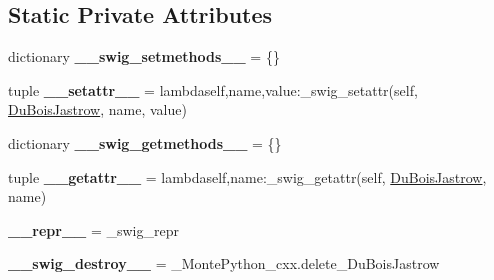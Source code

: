 \subsection*{Static Private Attributes}
\begin{DoxyCompactItemize}
\item 
\hypertarget{classMontePython__cxx_1_1DuBoisJastrow_a732f9b837b386085402f1f03011d7539}{}dictionary {\bfseries \+\_\+\+\_\+swig\+\_\+setmethods\+\_\+\+\_\+} = \{\}\label{classMontePython__cxx_1_1DuBoisJastrow_a732f9b837b386085402f1f03011d7539}

\item 
\hypertarget{classMontePython__cxx_1_1DuBoisJastrow_acb3d90c5bdc55fd408e559f2d5fac170}{}tuple {\bfseries \+\_\+\+\_\+setattr\+\_\+\+\_\+} = lambdaself,name,value\+:\+\_\+swig\+\_\+setattr(self, \hyperlink{classMontePython__cxx_1_1DuBoisJastrow}{Du\+Bois\+Jastrow}, name, value)\label{classMontePython__cxx_1_1DuBoisJastrow_acb3d90c5bdc55fd408e559f2d5fac170}

\item 
\hypertarget{classMontePython__cxx_1_1DuBoisJastrow_a7ad1853b1e6bea21055c01d6d36e38ff}{}dictionary {\bfseries \+\_\+\+\_\+swig\+\_\+getmethods\+\_\+\+\_\+} = \{\}\label{classMontePython__cxx_1_1DuBoisJastrow_a7ad1853b1e6bea21055c01d6d36e38ff}

\item 
\hypertarget{classMontePython__cxx_1_1DuBoisJastrow_af15ca982a357ec9f2b730cc644890070}{}tuple {\bfseries \+\_\+\+\_\+getattr\+\_\+\+\_\+} = lambdaself,name\+:\+\_\+swig\+\_\+getattr(self, \hyperlink{classMontePython__cxx_1_1DuBoisJastrow}{Du\+Bois\+Jastrow}, name)\label{classMontePython__cxx_1_1DuBoisJastrow_af15ca982a357ec9f2b730cc644890070}

\item 
\hypertarget{classMontePython__cxx_1_1DuBoisJastrow_aee807c361d3b6f7b436b1275c24107de}{}{\bfseries \+\_\+\+\_\+repr\+\_\+\+\_\+} = \+\_\+swig\+\_\+repr\label{classMontePython__cxx_1_1DuBoisJastrow_aee807c361d3b6f7b436b1275c24107de}

\item 
\hypertarget{classMontePython__cxx_1_1DuBoisJastrow_a77a3629416a5c2894fdd68b7d18d9dab}{}{\bfseries \+\_\+\+\_\+swig\+\_\+destroy\+\_\+\+\_\+} = \+\_\+\+Monte\+Python\+\_\+cxx.\+delete\+\_\+\+Du\+Bois\+Jastrow\label{classMontePython__cxx_1_1DuBoisJastrow_a77a3629416a5c2894fdd68b7d18d9dab}

\end{DoxyCompactItemize}


